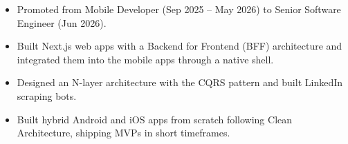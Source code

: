 \documentclass[9pt,a4paper]{altacv}
\begin{document}

\begin{itemize}
	\item Promoted from Mobile Developer (Sep 2025 -- May 2026) to Senior Software Engineer (Jun 2026).
	\item Built Next.js web apps with a Backend for Frontend (BFF) architecture and integrated them into the mobile apps through a native shell.
\end{itemize}

\divider

\begin{itemize}
	\item Designed an N-layer architecture with the CQRS pattern and built LinkedIn scraping bots.
\end{itemize}

\divider

\begin{itemize}
	\item Built hybrid Android and iOS apps from scratch following Clean Architecture, shipping MVPs in short timeframes.
\end{itemize}

\clearpage
\end{document}
